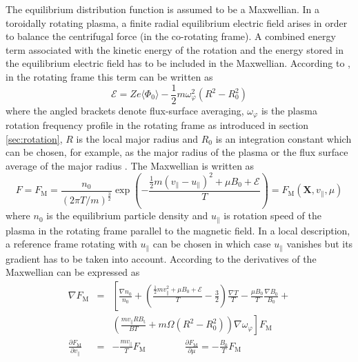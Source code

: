 \documentclass[a4paper,10pt]{article}
\newcommand{\st}[1]{\mathrm{#1}} %
\renewcommand{\vec}[1]{\mathbf{#1}}
\begin{document}
The equilibrium distribution function is assumed to be a Maxwellian. In a toroidally rotating plasma, a finite radial equilibrium electric field arises in order to balance the centrifugal force (in the co-rotating frame). A combined energy term associated with the kinetic energy of the rotation and the energy stored in the equilibrium electric field has to be included in the Maxwellian. According to \cite{peeters_rotation}, in the rotating frame this term can be written as 
\begin{equation*}
 \mathcal{E} = Z e \langle \Phi_0 \rangle - \frac{1}{2} m \omega_{\varphi}^2 (R^2-R_0^2)
\end{equation*}
where the angled brackets denote flux-surface averaging, $\omega_{\varphi}$ is the plasma rotation frequency profile in the rotating frame as introduced in section \ref{sec:rotation}, $R$ is the local major radius and $R_0$ is an integration constant which can be chosen, for example, as the major radius of the plasma or the flux surface average of the major radius \cite{Casson2010}. The Maxwellian is written as
\begin{equation}
	F = F_{\st{M}} = \frac{n_0}{ (2 \pi T / m)^{\frac{3}{2}} } \exp\left( - \frac{\frac{1}{2} m (v_{\parallel} - u_{\parallel})^2 + \mu B_0 + \mathcal{E}}{T} \right) = F_{\st{M}}(\vec{X},v_{\parallel},\mu)
	\label{eq:maxwellian}
\end{equation}
where $n_0$ is the equilibrium particle density and $u_{\parallel}$ is rotation speed of the plasma in the rotating frame parallel to the magnetic field. In a local description, a reference frame rotating with $u_{\parallel}$ can be chosen in which case $u_{\parallel}$ vanishes but its gradient has to be taken into account. According to \cite{peeters_rotation} the derivatives of the Maxwellian can be expressed as
\begin{eqnarray}
	\nabla F_{\st{M}} &=& \left[ \frac{\nabla n_0}{n_0} + \left( \frac{\frac{1}{2} m v_{\parallel}^2 + \mu B_0 + \mathcal{E}}{T} - \frac{3}{2} \right) \frac{\nabla T}{T} - \frac{\mu B_0}{T} \frac{\nabla B_0}{B_0} + \right. \nonumber \\ 
	&& \left. \left( \frac{m v_{\parallel} R B_{\st{t}}}{B T} + m \Omega (R^2-R_0^2) \right) \nabla \omega_{\varphi} \right] F_{\st{M}} \nonumber \\
	\frac{\partial F_{\st{M}}}{\partial v_{\parallel}} &=& - \frac{m v_{\parallel}}{T} F_{\st{M}} \qquad \qquad \frac{\partial F_{\st{M}}}{\partial \mu} = - \frac{B_0}{T} F_{\st{M}} \label{eq:grad_F_M}
\end{eqnarray}
\end{document}
